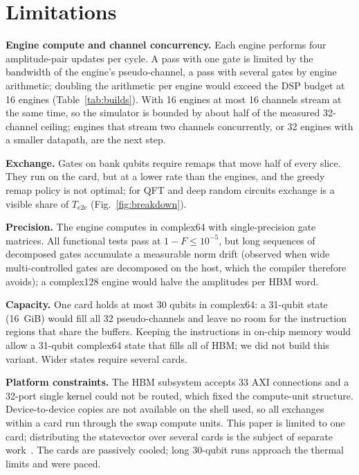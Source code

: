 \documentclass[pdflatex,sn-mathphys-num]{sn-jnl}
\newcommand{\NumHbmPortConnections}{33}
\theoremstyle{thmstyleone}
\theoremstyle{thmstylethree}
\begin{document}
\section{Limitations}\label{sec:limitations}

\textbf{Engine compute and channel concurrency.} Each engine performs four amplitude-pair updates per cycle. A pass with one gate is limited by the bandwidth of the engine's pseudo-channel, a pass with several gates by engine arithmetic; doubling the arithmetic per engine would exceed the DSP budget at 16 engines (Table~\ref{tab:builds}). With 16 engines at most 16 channels stream at the same time, so the simulator is bounded by about half of the measured 32-channel ceiling; engines that stream two channels concurrently, or 32 engines with a smaller datapath, are the next step.

\textbf{Exchange.} Gates on bank qubits require remaps that move half of every slice. They run on the card, but at a lower rate than the engines, and the greedy remap policy is not optimal; for QFT and deep random circuits exchange is a visible share of $T_\mathrm{e2e}$ (Fig.~\ref{fig:breakdown}).

\textbf{Precision.} The engine computes in complex64 with single-precision gate matrices. All functional tests pass at $1-F\leq 10^{-5}$, but long sequences of decomposed gates accumulate a measurable norm drift (observed when wide multi-controlled gates are decomposed on the host, which the compiler therefore avoids); a complex128 engine would halve the amplitudes per HBM word.

\textbf{Capacity.} One card holds at most 30 qubits in complex64: a 31-qubit state (16~GiB) would fill all 32 pseudo-channels and leave no room for the instruction regions that share the buffers. Keeping the instructions in on-chip memory would allow a 31-qubit complex64 state that fills all of HBM; we did not build this variant. Wider states require several cards.

\textbf{Platform constraints.} The HBM subsystem accepts \NumHbmPortConnections{} AXI connections and a 32-port single kernel could not be routed, which fixed the compute-unit structure. Device-to-device copies are not available on the shell used, so all exchanges within a card run through the swap compute units. This paper is limited to one card; distributing the statevector over several cards is the subject of separate work~\cite{ali2026multifpga}. The cards are passively cooled; long 30-qubit runs approach the thermal limits and were paced.
\end{document}
